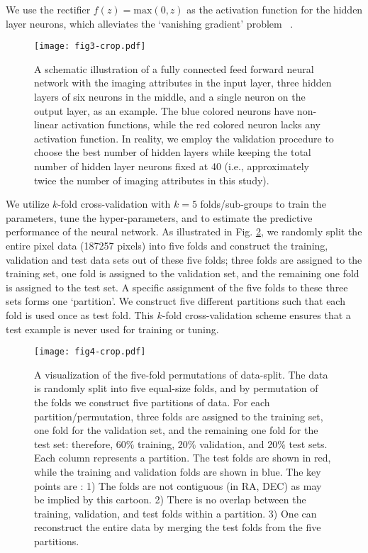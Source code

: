 \documentclass[fleqn, usenatbib]{mnras}
\begin{document}
We use the rectifier $f(z) = \text{max}(0, z)$ as the activation function for the hidden layer neurons, which alleviates the `vanishing gradient' problem
~\citep[see e.g.,][]{nair2010rectified,glorot2011deep,krizhevsky2012imagenet, dahl2013improving,montufar2014number}. \\

\begin{figure}
\texttt{[image: fig3-crop.pdf]}
\caption{A schematic illustration of a fully connected feed forward neural network with the imaging attributes in the input layer, three hidden layers of six neurons in the middle, and a single neuron on the output layer, as an example. The blue colored neurons have non-linear activation functions, while the red colored neuron lacks any activation function. In reality, we employ the validation procedure to choose the best number of hidden layers while keeping the total number of hidden layer neurons fixed at 40 (i.e., approximately twice the number of imaging attributes in this study).}\label{fig:ffnn}
\end{figure}

We utilize  $k$-fold cross-validation with $k=5$ folds/sub-groups to train the parameters, tune the hyper-parameters, and to estimate the predictive performance of the neural network. As illustrated in Fig. \ref{fig:5fold}, we randomly split the entire pixel data (187257 pixels) into five folds and construct the training, validation and test data sets out of these five folds; three folds are assigned to the training set, one fold is assigned to the validation set, and the remaining one fold is assigned to the test set. A specific assignment of the five folds to these three sets forms one `partition'. We construct five different partitions such that each fold is used once as test fold. This $k$-fold cross-validation scheme ensures that a test example is never used for training or tuning.\\

\begin{figure}
         \centering
         \texttt{[image: fig4-crop.pdf]}
         \caption{A visualization of the five-fold permutations of data-split. The data is randomly split into five equal-size folds, and by permutation of the folds we construct five partitions of data. For each partition/permutation, three folds are assigned to the training set, one fold for the validation set, and the remaining one fold for the test set: therefore, 60\% training, 20\% validation, and 20\% test sets. Each column represents a partition. The test folds are shown in red, while the training and validation folds are shown in blue. The key points are : 1) The folds are not contiguous (in RA, DEC) as may be implied by this cartoon. 2) There is no overlap between the training, validation, and test folds within a partition. 3) One can reconstruct the entire data by merging the test folds from the five partitions.}
         \label{fig:5fold}
     \end{figure}
     
\end{document}
